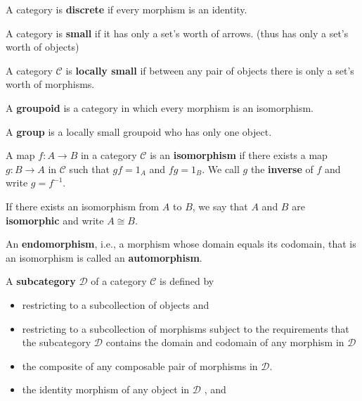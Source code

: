 \documentclass[12pt, oneside]{book}
\begin{document}
\begin{definition}
    A category is \textbf{discrete} if every morphism is an identity.

    A category is \textbf{small} if it has only a set's worth of arrows.
    (thus has only a set's worth of objects)

    A category $\mathcal{C}$ is \textbf{locally small} if between any pair of objects there is only a set's worth of morphisms.
\end{definition}
\begin{definition}
    A \textbf{groupoid} is a category in which every morphism is an isomorphism.

    A \textbf{group} is a locally small groupoid who has only one object.
\end{definition}

\begin{definition}
    A map $f: A \rightarrow B$ in a category $\mathcal{C}$ is an \textbf{isomorphism} if there exists a map $g: B \rightarrow A$ in $\mathcal{C}$ such that $g f=1_A$ and $f g=1_B$.
    We call $g$ the \textbf{inverse} of $f$ and write $g=f^{-1}$.

    If there exists an isomorphism from $A$ to $B$, we say that $A$ and $B$ are \textbf{isomorphic} and write $A \cong B$.

    An \textbf{endomorphism}, i.e., a morphism whose domain equals its codomain, that is an isomorphism is called an \textbf{automorphism}.
\end{definition}

\begin{definition}
    A \textbf{subcategory} $\mathcal{D}$ of a category $\mathcal{C}$ is defined by
    \begin{itemize}
        \item  restricting to a subcollection of objects and
        \item  restricting to a subcollection of morphisms subject to the requirements
              that the subcategory $\mathcal{D}$ contains the domain and codomain of any morphism in $\mathcal{D}$
        \item  the composite of any composable pair of morphisms in $\mathcal{D}$.
        \item the identity morphism of any object in $\mathcal{D}$ , and
    \end{itemize}

\end{definition}
\end{document}
